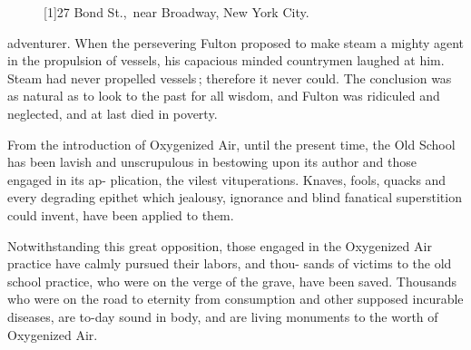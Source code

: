 \documentclass[10pt]{article}
\begin{document}
\begin{multicols}{3}
\begin{figure}
\vspace{3mm}

\hspace{-8mm}\scalebox{1.15}[1]{27 Bond St.,\ near Broadway, New York City.}
\end{figure}
adventurer. When the persevering Fulton\linebreak
proposed to make steam a mighty agent in\linebreak
the propulsion of vessels, his capacious minded\linebreak
countrymen laughed at him. Steam had\linebreak
never propelled vessels\,; therefore it never\linebreak
could. The conclusion was as natural as to\linebreak
look to the past for all wisdom, and Fulton\linebreak
was ridiculed and neglected, and at last died\linebreak
in poverty.

From the introduction of Oxygenized Air,\linebreak
until the present time, the Old School has\linebreak
been lavish and unscrupulous in bestowing\linebreak
upon its author and those engaged in its ap-\linebreak
plication, the vilest vituperations. Knaves,\linebreak
fools, quacks and every degrading epithet\linebreak
which jealousy, ignorance and blind fanatical\linebreak
superstition could invent, have been applied\linebreak
to them.

Notwithstanding this great opposition,\linebreak
those engaged in the Oxygenized Air practice\linebreak
have calmly pursued their labors, and thou-\linebreak
sands of victims to the old school practice,\linebreak
who were on the verge of the grave, have been\linebreak
saved. Thousands who were on the road to\linebreak
eternity from consumption and other supposed\linebreak
incurable diseases, are to-day sound in body,\linebreak
and are living monuments to the worth of\linebreak
Oxygenized Air.


\end{multicols}
\end{document}
